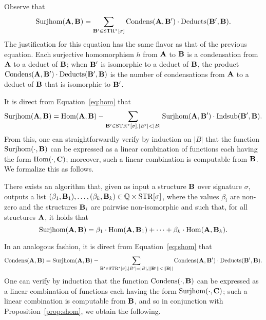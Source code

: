 \documentclass[11pt]{article}
\begin{document}
Observe that 
\begin{equation}
\label{eq:shom}
\mathrm{Surjhom}(\mathbf{A},\mathbf{B}) = 
\sum_{\mathbf{B}' \in \mathrm{STR}^*[\sigma]}
\mathrm{Condens}(\mathbf{A},\mathbf{B}') \cdot \mathrm{Deducts}(\mathbf{B}', \mathbf{B}).
\end{equation}
The justification for this equation has the same flavor as
that of the previous equation.  
Each surjective homomorphism $h$ from $\mathbf{A}$ to $\mathbf{B}$
is a condensation from $\mathbf{A}$ to a deduct of $\mathbf{B}$;
when $\mathbf{B}'$ is isomorphic to a deduct of $\mathbf{B}$,
the product $\mathrm{Condens}(\mathbf{A},\mathbf{B}') \cdot \mathrm{Deducts}(\mathbf{B}', \mathbf{B})$
is the number of condensations from $\mathbf{A}$ to 
a deduct of $\mathbf{B}$ that is isomorphic to $\mathbf{B}'$.

It is direct from Equation~\ref{eq:hom}
that 
\begin{equation}
\label{eq:shom-new}
\mathrm{Surjhom}(\mathbf{A},\mathbf{B}) = \mathrm{Hom}(\mathbf{A},\mathbf{B}) - 
\sum_{\mathbf{B}' \in \mathrm{STR}^*[\sigma], |B'| < |B|} 
\mathrm{Surjhom}(\mathbf{A},\mathbf{B}') \cdot \mathrm{Indsub}(\mathbf{B}',\mathbf{B}).
\end{equation}
From this, one can straightforwardly verify by induction on $|B|$
that the function $\mathrm{Surjhom}(\cdot,\mathbf{B})$
can be expressed as a linear combination of functions
each having the form
$\mathrm{Hom}(\cdot,\mathbf{C})$; moreover, such a linear combination is
computable from $\mathbf{B}$.  We formalize this as follows.

\begin{prop}
\label{prop:shom}
There exists an algorithm that,
given as input a structure $\mathbf{B}$ over signature $\sigma$,
outputs a list 
$(\beta_1,\mathbf{B}_1),\ldots,(\beta_k,\mathbf{B}_k) \in \mathbb{Q} \times \mathrm{STR}[\sigma]$,
where the 
values $\beta_i$ are non-zero
and the structures
$\mathbf{B}_i$ are pairwise non-isomorphic and
such that, for all structures $\mathbf{A}$, it holds that
$$\mathrm{Surjhom}(\mathbf{A},\mathbf{B}) = 
\beta_1 \cdot \mathrm{Hom}(\mathbf{A},\mathbf{B}_1)
+ \cdots + 
\beta_k \cdot \mathrm{Hom}(\mathbf{A},\mathbf{B}_k).$$
\end{prop}

In an analogous fashion,
it is direct from Equation~\ref{eq:shom}
that
\begin{equation}
\label{eq:condens-new}
\mathrm{Condens}(\mathbf{A},\mathbf{B}) = \mathrm{Surjhom}(\mathbf{A},\mathbf{B}) -
\sum_{\mathbf{B}' \in \mathrm{STR}^*[\sigma], |B'| = |B|, ||\mathbf{B}'|| < ||\mathbf{B}||}
\mathrm{Condens}(\mathbf{A},\mathbf{B}') \cdot \mathrm{Deducts}(\mathbf{B}', \mathbf{B}).
\end{equation}
One can verify by induction that the function $\mathrm{Condens}(\cdot,\mathbf{B})$
can be expressed as a linear combination of functions each having the form
$\mathrm{Surjhom}(\cdot,\mathbf{C})$; such a linear combination is computable from
$\mathbf{B}$, and so in conjunction with Proposition~\ref{prop:shom},
we obtain the following.
\end{document}

